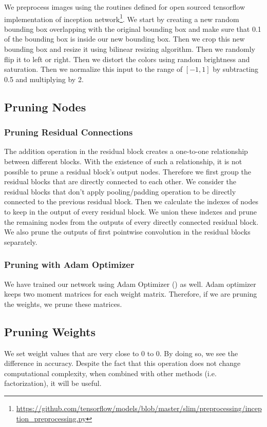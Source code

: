 We preprocess images using the routines defined for open sourced tensorflow implementation of inception network\footnote{\url{https://github.com/tensorflow/models/blob/master/slim/preprocessing/inception_preprocessing.py}}. We start by creating a new random bounding box overlapping with the original bounding box and make sure that 0.1 of the bounding box is inside our new bounding box. Then we crop this new bounding box and resize it using bilinear resizing algorithm. Then we randomly flip it to left or right. Then we distort the colors using random brightness and saturation. Then we normalize this input to the range of $[-1,1]$ by subtracting 0.5 and multiplying by 2. 

\subsection{Pruning Nodes}
\subsubsection{Pruning Residual Connections}
The addition operation in the residual block creates a one-to-one relationship between different blocks. With the existence of such a relationship, it is not possible to prune a residual block's output nodes. Therefore we first group the residual blocks that are directly connected to each other. We consider the residual blocks that don't apply pooling/padding operation to be directly connected to the previous residual block. Then we calculate the indexes of nodes to keep in the output of every residual block. We union these indexes and prune the remaining nodes from the outputs of every directly connected residual block. We also prune the outputs of first pointwise convolution in the residual blocks separately. 

\subsubsection{Pruning with Adam Optimizer}
We have trained our network using Adam Optimizer (\cite{kingma2014adam}) as well. Adam optimizer keeps two moment matrices for each weight matrix. Therefore, if we are pruning the weights, we prune these matrices.

\subsection{Pruning Weights}
We set weight values that are very close to $0$ to $0$. By doing so, we see the difference in accuracy. Despite the fact that this operation does not change computational complexity, when combined with other methods (i.e. factorization), it will be useful. 

